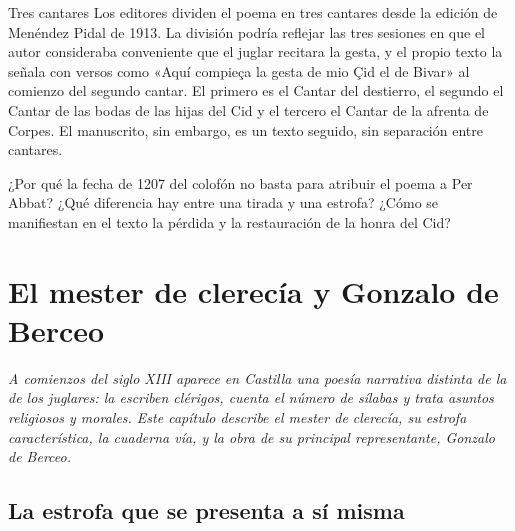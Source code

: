 \documentclass{book}
\begin{document}
\begin{tcolorbox}[title={Autoficha}, studiumcheck, breakable]

Tres cantares
Los editores dividen el poema en tres cantares desde la edición de Menéndez Pidal de 1913. La división podría reflejar las tres sesiones en que el autor consideraba conveniente que el juglar recitara la gesta, y el propio texto la señala con versos como «Aquí compieça la gesta de mio Çid el de Bivar» al comienzo del segundo cantar. El primero es el Cantar del destierro, el segundo el Cantar de las bodas de las hijas del Cid y el tercero el Cantar de la afrenta de Corpes. El manuscrito, sin embargo, es un texto seguido, sin separación entre cantares.


¿Por qué la fecha de 1207 del colofón no basta para atribuir el poema a Per Abbat? ¿Qué diferencia hay entre una tirada y una estrofa? ¿Cómo se manifiestan en el texto la pérdida y la restauración de la honra del Cid?

\end{tcolorbox}

\chapter{El mester de clerecía y Gonzalo de Berceo}
\label{chap:lit-02}

\noindent\textit{A comienzos del siglo XIII aparece en Castilla una poesía narrativa distinta de la de los juglares: la escriben clérigos, cuenta el número de sílabas y trata asuntos religiosos y morales. Este capítulo describe el mester de clerecía, su estrofa característica, la cuaderna vía, y la obra de su principal representante, Gonzalo de Berceo.}


\section{La estrofa que se presenta a sí misma}
\end{document}
